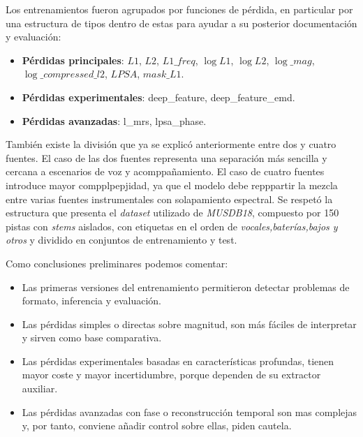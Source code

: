 Los entrenamientos fueron agrupados por funciones de pérdida, en particular por una estructura de tipos dentro de estas para ayudar a su posterior documentación y evaluación:

\begin{itemize}
    \item \textbf{Pérdidas principales}: $L1$, $L2$, $L1\_freq$, $\log L1$, $\log L2$, $\log\_mag$, $\log\_compressed\_l2$, $LPSA$, $mask\_L1$.
    \item \textbf{Pérdidas experimentales}: deep\_feature, deep\_feature\_emd.
    \item \textbf{Pérdidas avanzadas}: l\_mrs, lpsa\_phase.
\end{itemize}

También existe la división que ya se explicó anteriormente entre dos y cuatro fuentes. El caso de las dos fuentes representa una separación más sencilla y cercana a escenarios de voz y acomppañamiento.
El caso de cuatro fuentes introduce mayor compplpepjidad, ya que el modelo debe repppartir la mezcla entre varias fuentes instrumentales con solapamiento espectral.
Se respetó la estructura que presenta el \textit{dataset} utilizado de \textit{MUSDB18}, compuesto por 150 pistas con \textit{stems} aislados, con etiquetas en el orden de \textit{vocales,baterías,bajos y otros} y dividido en conjuntos de entrenamiento y test.

Como conclusiones preliminares podemos comentar:

\begin{itemize}
    \item Las primeras versiones del entrenamiento permitieron detectar problemas de formato, inferencia y evaluación.
    \item Las pérdidas simples o directas sobre magnitud, son más fáciles de interpretar y sirven como base comparativa.
    \item Las pérdidas experimentales basadas en características profundas, tienen mayor coste y mayor incertidumbre, porque dependen de su extractor auxiliar.
    \item Las pérdidas avanzadas con fase o reconstrucción temporal son mas complejas y, por tanto, conviene añadir control sobre ellas, piden cautela.
\end{itemize}